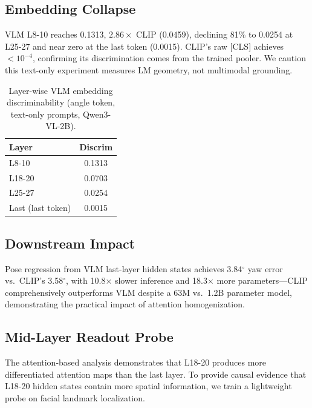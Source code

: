 \documentclass[10pt,twocolumn,letterpaper]{article}
\begin{document}
\subsection{Embedding Collapse}
\label{sec:embed}

VLM L8-10 reaches 0.1313, $2.86\times$ CLIP (0.0459), declining 81\% to 0.0254 at L25-27 and near zero at the last token (0.0015). CLIP's raw [CLS] achieves $<10^{-4}$, confirming its discrimination comes from the trained pooler. We caution this text-only experiment measures LM geometry, not multimodal grounding.

\begin{table}[t]
\centering
\small
\caption{Layer-wise VLM embedding discriminability (angle token, text-only prompts, Qwen3-VL-2B).}
\label{tab:embed}
\begin{tabular}{lc}
\toprule
Layer & Discrim \\
\midrule
L8-10 & 0.1313 \\
L18-20 & 0.0703 \\
L25-27 & 0.0254 \\
Last (last token) & 0.0015 \\
\bottomrule
\end{tabular}
\end{table}

\subsection{Downstream Impact}

Pose regression from VLM last-layer hidden states achieves 3.84$^\circ$ yaw error vs.\ CLIP's 3.58$^\circ$, with 10.8$\times$ slower inference and 18.3$\times$ more parameters---CLIP comprehensively outperforms VLM despite a 63M vs.\ 1.2B parameter model, demonstrating the practical impact of attention homogenization.

\subsection{Mid-Layer Readout Probe}
\label{sec:probe}

The attention-based analysis demonstrates that L18-20 produces more differentiated attention maps than the last layer. To provide causal evidence that L18-20 hidden states contain more spatial information, we train a lightweight probe on facial landmark localization.
\end{document}

